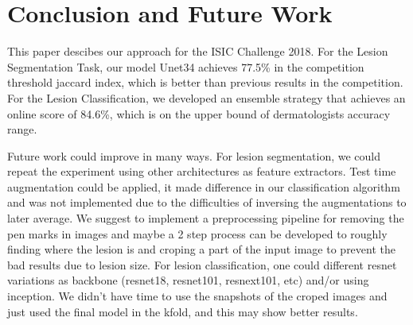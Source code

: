 \documentclass[conference]{IEEEtran}
\begin{document}
\section{Conclusion and Future Work}

This paper descibes our approach for the ISIC Challenge 2018. For the Lesion Segmentation Task, our model Unet34 achieves 77.5\% in the competition threshold jaccard index, which is better than previous results in the competition. For the Lesion Classification, we developed an ensemble strategy that achieves an online score of 84.6\%, which is on the upper bound of dermatologists accuracy range.

Future work could improve in many ways. For lesion segmentation, we could repeat the experiment using other architectures as feature extractors. Test time augmentation could be applied, it made difference in our classification algorithm and was not implemented due to the difficulties of inversing the augmentations to later average.  We suggest to implement a preprocessing pipeline for removing the pen marks in images and maybe a 2 step process can be developed to roughly finding where the lesion is and croping a part of the input image to prevent the bad results due to lesion size. For lesion classification, one could different resnet variations as backbone (resnet18, resnet101, resnext101, etc) and/or using inception. We didn't have time to use the snapshots of the croped images and just used the final model in the kfold, and this may show better results.




\end{document}
